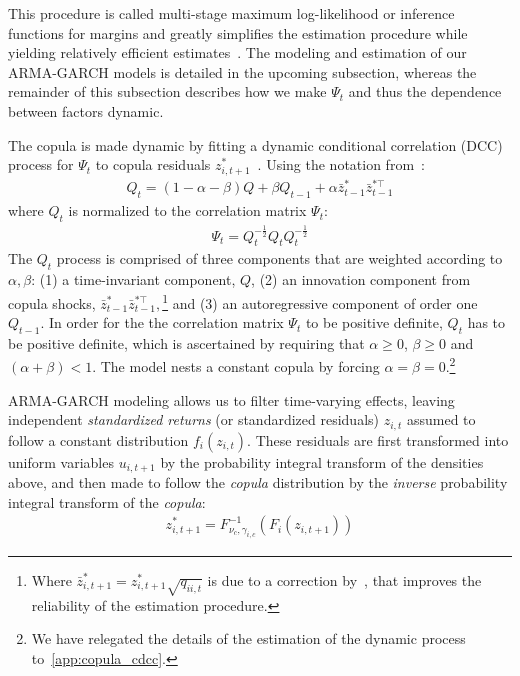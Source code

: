 This procedure is called multi-stage maximum log-likelihood or inference functions for margins and greatly simplifies the estimation procedure while yielding relatively efficient estimates~\autocite{Patton2006,Joe1997}. The modeling and estimation of our ARMA-GARCH models is detailed in the upcoming subsection, whereas the remainder of this subsection describes how we make $\Psi_t$ and thus the dependence between factors dynamic.

The copula is made dynamic by fitting a dynamic conditional correlation (DCC) process for $\Psi_t$ to copula residuals $z_{i,t+1}^*$~\autocite{Engle2002}. Using the notation from~\textcite{ChristoffersenLanglois2013}:
\begin{align}
  Q_t = (1 - \alpha - \beta) Q
    + \beta Q_{t-1}
    + \alpha \bar{z}_{t-1}^* \bar{z}_{t-1}^{*\top}
\end{align}
where $Q_t$ is normalized to the correlation matrix $\Psi_t$:
\begin{align}
  \Psi_t = Q_t^{-\frac{1}{2}} Q_t Q_t^{-\frac{1}{2}}
\end{align}
The $Q_t$ process is comprised of three components that are weighted according to $\alpha, \beta$: (1) a time-invariant component, $Q$, (2) an innovation component from copula shocks, $\bar{z}_{t-1}^{*} \bar{z}_{t-1}^{*\top},$\footnote{Where $\bar{z}_{i,t+1}^* = z_{i,t+1}^* \sqrt{q_{ii,t}}$ is due to a correction by~\textcite{Aielli2013}, that improves the reliability of the estimation procedure.} and (3) an autoregressive component of order one $Q_{t-1}$. In order for the the correlation matrix $\Psi_t$ to be positive definite, $Q_t$ has to be positive definite, which is ascertained by requiring that $\alpha \geq 0$, $\beta \geq 0$ and $(\alpha + \beta) < 1$. The model nests a constant copula by forcing $\alpha = \beta = 0$.\footnote{We have relegated the details of the estimation of the dynamic process to~\autoref{app:copula_cdcc}.}

ARMA-GARCH modeling allows us to filter time-varying effects, leaving independent \emph{standardized returns} (or standardized residuals) $z_{i,t}$ assumed to follow a constant distribution $f_i(z_{i,t})$. These residuals are first transformed into uniform variables $u_{i,t+1}$ by the probability integral transform of the densities above, and then made to follow the \emph{copula} distribution by the \emph{inverse} probability integral transform of the \emph{copula}:
\begin{align}
  z_{i,t+1}^* = F^{-1}_{\nu_c,\gamma_{i,c}}(F_{i}(z_{i,t+1}))
\end{align}



